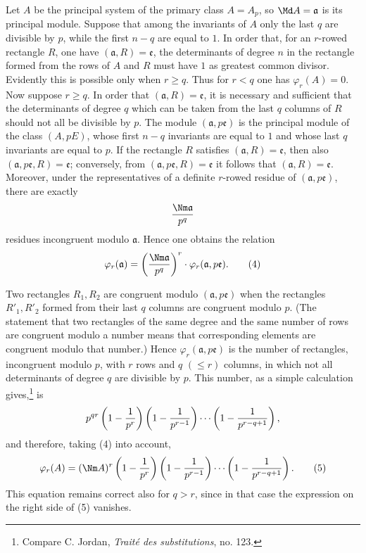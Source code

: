 Let $A$ be the principal system of the primary class $A=A_p$, so $\Md A=\mathfrak a$ is its principal module. Suppose that among the invariants of $A$ only the last $q$ are divisible by $p$, while the first $n-q$ are equal to $1$. In order that, for an $r$-rowed rectangle $R$, one have $(\mathfrak a,R)=\mathfrak e$, the determinants of degree $n$ in the rectangle formed from the rows of $A$ and $R$ must have $1$ as greatest common divisor. Evidently this is possible only when $r\ge q$. Thus for $r<q$ one has $\varphi_r(A)=0$. Now suppose $r\ge q$. In order that $(\mathfrak a,R)=\mathfrak e$, it is necessary and sufficient that the determinants of degree $q$ which can be taken from the last $q$ columns of $R$ should not all be divisible by $p$. The module $(\mathfrak a,p\mathfrak e)$ is the principal module of the class $(A,pE)$, whose first $n-q$ invariants are equal to $1$ and whose last $q$ invariants are equal to $p$. If the rectangle $R$ satisfies $(\mathfrak a,R)=\mathfrak e$, then also $(\mathfrak a,p\mathfrak e,R)=\mathfrak e$; conversely, from $(\mathfrak a,p\mathfrak e,R)=\mathfrak e$ it follows that $(\mathfrak a,R)=\mathfrak e$. Moreover, under the representatives of a definite $r$-rowed residue of $(\mathfrak a,p\mathfrak e)$, there are exactly
\[
 {\Nm\mathfrak a\over p^q}
\]
residues incongruent modulo $\mathfrak a$. Hence one obtains the relation
\begin{equation}
 \varphi_r(\mathfrak a)=\left({\Nm\mathfrak a\over p^q}\right)^r\cdot \varphi_r(\mathfrak a,p\mathfrak e).
\tag{4}
\end{equation}

Two rectangles $R_1,R_2$ are congruent modulo $(\mathfrak a,p\mathfrak e)$ when the rectangles $R'_1,R'_2$ formed from their last $q$ columns are congruent modulo $p$. (The statement that two rectangles of the same degree and the same number of rows are congruent modulo a number means that corresponding elements are congruent modulo that number.) Hence $\varphi_r(\mathfrak a,p\mathfrak e)$ is the number of rectangles, incongruent modulo $p$, with $r$ rows and $q$ $(\le r)$ columns, in which not all determinants of degree $q$ are divisible by $p$. This number, as a simple calculation gives,\footnote{Compare C. Jordan, \emph{Traité des substitutions}, no. 123.} is
\[
 p^{qr}\left(1-{1\over p^r}\right)
 \left(1-{1\over p^{r-1}}\right)
 \cdots
 \left(1-{1\over p^{r-q+1}}\right),
\]
and therefore, taking (4) into account,
\begin{equation}
 \varphi_r(A)=(\Nm A)^r
 \left(1-{1\over p^r}\right)
 \left(1-{1\over p^{r-1}}\right)
 \cdots
 \left(1-{1\over p^{r-q+1}}\right).
\tag{5}
\end{equation}
This equation remains correct also for $q>r$, since in that case the expression on the right side of (5) vanishes.

